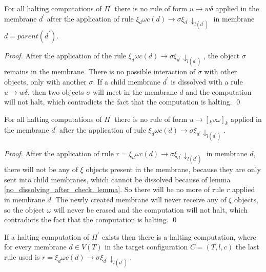 \documentclass[llncs,submission,copyright,creativecommons]{../lib/lncs/llncs}
\begin{document}
\begin{lemma}
\label{no_dissolving_after_check_lemma}
  For all halting computations of $\Pi^\prime$ there is no rule of form $u\rightarrow w\delta$ applied in the membrane $d^\prime$ after the application of rule $\xi_d\omega c(d)\rightarrow\sigma\xi_{d^\prime}\downarrow_{l(d^\prime)}$ in membrane $d=parent(d^\prime)$.
\end{lemma}

\begin{proof}
  After the application of the rule $\xi_d\omega c(d)\rightarrow\sigma\xi_{d^\prime}\downarrow_{l(d^\prime)}$, the object $\sigma$ remains in the membrane. There is no possible interaction of $\sigma$ with other objects, only with another $\sigma$. If a child membrane $d^\prime$ is dissolved with a rule $u\rightarrow w\delta$, then two objects $\sigma$ will meet in the membrane $d$ and the computation will not halt, which contradicts the fact that the computation is halting. \qed
\end{proof}

\begin{lemma}
\label{no_creating_new_membrane_after_check_lemma}
  For all halting computations of $\Pi^\prime$ there is no rule of form $u\rightarrow [_k v\omega]_k$ applied in the membrane $d^\prime$ after the application of rule $\xi_d\omega c(d)\rightarrow\sigma\xi_{d^\prime}\downarrow_{l(d^\prime)}$.
\end{lemma}

\begin{proof}
  After the application of rule $r = \xi_d\omega c(d)\rightarrow\sigma\xi_{d^\prime}\downarrow_{l(d^\prime)}$ in membrane $d$, there will not be any of $\xi$ objects present in the membrane, because they are only sent into child membranes, which cannot be dissolved because of lemma \ref{no_dissolving_after_check_lemma}. So there will be no more of rule $r$ applied in membrane $d$. The newly created membrane will never receive any of $\xi$ objects, so the object $\omega$ will never be erased and the computation will not halt, which contradicts the fact that the computation is halting. \qed
\end{proof}

\begin{lemma}
\label{check_at_last_lemma}
  If a halting computation of $\Pi^\prime$ exists then there is a halting computation, where for every membrane $d\in V(T)$ in the target configuration $C=(T,l,c)$ the last rule used is $r = \xi_d\omega c(d)\rightarrow\sigma\xi_{d^\prime}\downarrow_{l(d^\prime)}$.
\end{lemma}
\end{document}
